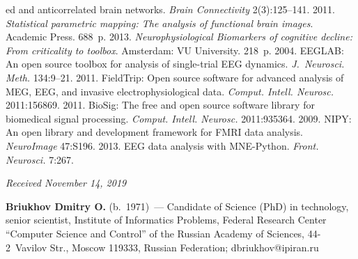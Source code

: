 \begin{multicols}{2}
{{\begin{thebibliography}{99}
\columnbreak 

\noindent
ed and anticorrelated brain networks. 
\textit{Brain Connectivity} 2(3):125--141.
 2011. \textit{Statistical parametric mapping: The analysis of 
functional brain images}. Academic Press. 688~p.
 2013. \textit{Neurophysiological Biomarkers of cognitive decline: 
From criticality to toolbox}. Amsterdam: VU University. 218~p.
 2004. EEGLAB: An open source toolbox for 
analysis of single-trial EEG dynamics. \textit{J.~Neurosci. Meth.} 
134:9--21.
 2011. FieldTrip: 
Open source software for advanced analysis of MEG, EEG, and invasive 
electrophysiological data. \textit{Comput. Intell. 
Neurosc.} 2011:156869.
 2011. 
BioSig: The free and open source software library for biomedical signal 
processing. \textit{Comput. Intell. Neurosc.} 
2011:935364. 
 2009. NIPY: An open library 
and development framework for FMRI data analysis. \textit{NeuroImage} 
47:S196.
 2013. EEG data analysis with 
MNE-Python. \textit{Front. Neurosci.} 7:267.

\end{thebibliography}

 }
 }

\end{multicols}


\hfill{\small\textit{Received November 14, 2019}}



\Contr

    \noindent
\textbf{Briukhov Dmitry O.} (b.\ 1971)~--- Candidate of Science (PhD) in technology, senior 
scientist, Institute of Informatics Problems, Federal Research Center ``Computer Science and 
Control'' of the Russian Academy of Sciences, 44-2~Vavilov Str., Moscow 119333, Russian 
Federation; \mbox{dbriukhov@ipiran.ru}
    
